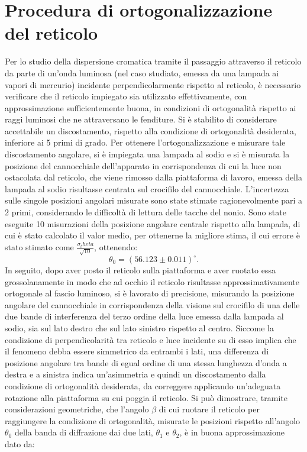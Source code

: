 \documentclass[a4paper,12pt]{article}
\begin{document}
\section{Procedura di ortogonalizzazione del reticolo }
\label{sec:ortogonalizzazione}
Per lo studio della dispersione cromatica tramite il passaggio attraverso il reticolo da parte di un’onda luminosa (nel caso studiato, emessa da una lampada ai vapori di mercurio) incidente perpendicolarmente rispetto al reticolo, è necessario verificare che il reticolo impiegato sia utilizzato effettivamente, con approssimazione sufficientemente buona, in condizioni di ortogonalità rispetto ai raggi luminosi che ne attraversano le fenditure. Si è stabilito di considerare accettabile un discostamento, rispetto alla condizione di ortogonalità desiderata, inferiore ai 5 primi di grado. Per ottenere l’ortogonalizzazione e misurare tale discostamento angolare, si è impiegata una lampada al sodio e si è misurata la posizione del cannocchiale dell’apparato in corrispondenza di cui la luce non ostacolata dal reticolo, che viene rimosso dalla piattaforma di lavoro, emessa della lampada al sodio risultasse centrata sul crocifilo del cannocchiale. L’incertezza sulle singole posizioni angolari misurate sono state stimate ragionevolmente pari a 2 primi, considerando le difficoltà di lettura delle tacche del nonio. Sono state eseguite 10 misurazioni della posizione angolare centrale rispetto alla lampada, di cui è stato calcolato il valor medio, per ottenerne la migliore stima, il cui errore è stato stimato come \(\frac{\sigma_theta}{\sqrt{10}}\), ottenendo: 
\[
\theta_0 = (56.123 \pm 0.011)^\circ.
\]
In seguito, dopo aver posto il reticolo sulla piattaforma e aver ruotato essa grossolanamente in modo che ad occhio il reticolo risultasse approssimativamente ortogonale al fascio luminoso, si è lavorato di precisione, misurando la posizione angolare del cannocchiale in corrispondenza della visione sul crocifilo di una delle due bande di interferenza del terzo ordine della luce emessa dalla lampada al sodio, sia sul lato destro che sul lato sinistro rispetto al centro. Siccome la condizione di perpendicolarità tra reticolo e luce incidente su di esso implica che il fenomeno debba essere simmetrico da entrambi i lati, una differenza di posizione angolare tra bande di egual ordine di una stessa lunghezza d’onda a destra e a sinistra indica un’asimmetria e quindi un discostamento dalla condizione di ortogonalità desiderata, da correggere applicando un’adeguata rotazione alla piattaforma su cui poggia il reticolo. 
Si può dimostrare, tramite considerazioni geometriche, che l’angolo \( \beta \) di cui ruotare il reticolo per raggiungere la condizione di ortogonalità, misurate le posizioni rispetto all’angolo \( \theta_0 \) della banda di diffrazione dai due lati, \( \theta_1 \) e \( \theta_2 \), è in buona approssimazione dato da:
\end{document}
